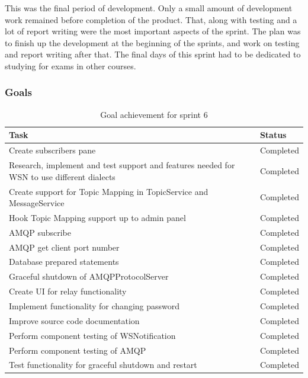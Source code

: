 This was the final period of development. Only a small amount of development work remained before completion of the product. That, along with testing and a lot of report writing were the most important aspects of the sprint. The plan was to finish up the development at the beginning of the sprints, and work on testing and report writing after that. The final days of this sprint had to be dedicated to studying for exams in other courses.

\subsubsection{Goals}
\label{subsec:project_lifecycle-development-sprint_6-goals}

\begin{table}[ht!]
\small
\centering
\begin{tabular}{ | p{10cm} | p{2cm} |}
\hline
\rowcolor{lightgray}
\textbf{Task} & \textbf{Status} \\
\hline
\rowcolor{green!30}
Create subscribers pane & Completed \\
\rowcolor{green!30}
Research, implement and test support and features needed for WSN to use different dialects & Completed \\
\rowcolor{green!30}
Create support for Topic Mapping in TopicService and MessageService & Completed \\
\rowcolor{green!30}
Hook Topic Mapping support up to admin panel & Completed \\\rowcolor{green!30}
AMQP subscribe & Completed \\
\rowcolor{green!30}
AMQP get client port number & Completed \\
\rowcolor{green!30}
Database prepared statements & Completed \\
\rowcolor{green!30}
Graceful shutdown of AMQPProtocolServer & Completed \\
\rowcolor{green!30}
Create UI for relay functionality & Completed \\
\rowcolor{green!30}
Implement functionality for changing password & Completed \\
\rowcolor{green!30}
Improve source code documentation & Completed \\
\rowcolor{green!30}
Perform component testing of WSNotification & Completed \\
\rowcolor{green!30}
Perform component testing of AMQP & Completed \\
\rowcolor{green!30}
Test functionality for graceful shutdown and restart & Completed \\
\hline
\end{tabular}
\caption{Goal achievement for sprint 6}
\label{tab:sprint 6, goals}
\end{table}

